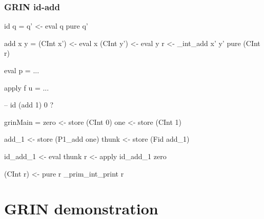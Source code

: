 \documentclass[bigger,aspectratio=169]{beamer}
\begin{document}
\begin{frame}[fragile]
\frametitle{GRIN id-add}
\begin{center}

	\begin{minipage}{0.40\textwidth}
		\begin{haskellcode}
			id q =
			 q' <- eval q
			 pure q'
		\end{haskellcode}
		\begin{haskellcode}
			add x y =
			 (CInt x') <- eval x
			 (CInt y') <- eval y
			 r <- _int_add x' y'
			 pure (CInt r)
		\end{haskellcode}
		\begin{haskellcode}
			eval p = ...
		\end{haskellcode}
		\begin{haskellcode}
			apply f u = ...
		\end{haskellcode}
	\end{minipage}
	\hfill
	\begin{minipage}{0.55\textwidth}
		\begin{haskellcode}
			-- id (add 1) 0 ?
		\end{haskellcode}
		\vspace{-0.60cm}
		\pause
		\begin{haskellcode}
		grinMain =
		 zero <- store (CInt 0)
		 one  <- store (CInt 1)

		 add_1 <- store (P1_add one)
		 thunk <- store (Fid add_1)

		 id_add_1 <- eval thunk
		 r <- apply id_add_1 zero

		 (CInt r) <- pure r
		 _prim_int_print r
		\end{haskellcode}
	\end{minipage}

\end{center}
\end{frame}

\section{GRIN demonstration}
\end{document}
